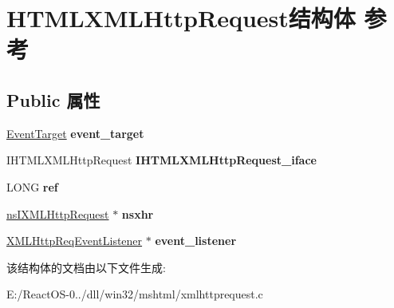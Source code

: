 \hypertarget{struct_h_t_m_l_x_m_l_http_request}{}\section{H\+T\+M\+L\+X\+M\+L\+Http\+Request结构体 参考}
\label{struct_h_t_m_l_x_m_l_http_request}
\subsection*{Public 属性}
\begin{DoxyCompactItemize}
\item 
\mbox{\label{struct_h_t_m_l_x_m_l_http_request_abf0929f8be46096436f04d561fbc8c94}} 
\hyperlink{struct_event_target}{Event\+Target} {\bfseries event\+\_\+target}
\item 
\mbox{\label{struct_h_t_m_l_x_m_l_http_request_a05a03b46fbd047240303f0a9e934b044}} 
I\+H\+T\+M\+L\+X\+M\+L\+Http\+Request {\bfseries I\+H\+T\+M\+L\+X\+M\+L\+Http\+Request\+\_\+iface}
\item 
\mbox{\label{struct_h_t_m_l_x_m_l_http_request_afd4ee8bf00e6f6ae4d07236fc4a0fcac}} 
L\+O\+NG {\bfseries ref}
\item 
\mbox{\label{struct_h_t_m_l_x_m_l_http_request_ae25b26a475e6be3d3a4cbb3b2e649faf}} 
\hyperlink{interfacens_i_x_m_l_http_request}{ns\+I\+X\+M\+L\+Http\+Request} $\ast$ {\bfseries nsxhr}
\item 
\mbox{\label{struct_h_t_m_l_x_m_l_http_request_acbe34fda04647a0b2e8ac86cb41cb353}} 
\hyperlink{struct_x_m_l_http_req_event_listener}{X\+M\+L\+Http\+Req\+Event\+Listener} $\ast$ {\bfseries event\+\_\+listener}
\end{DoxyCompactItemize}


该结构体的文档由以下文件生成\+:\begin{DoxyCompactItemize}
\item 
E\+:/\+React\+O\+S-\/0../dll/win32/mshtml/xmlhttprequest.\+c\end{DoxyCompactItemize}
